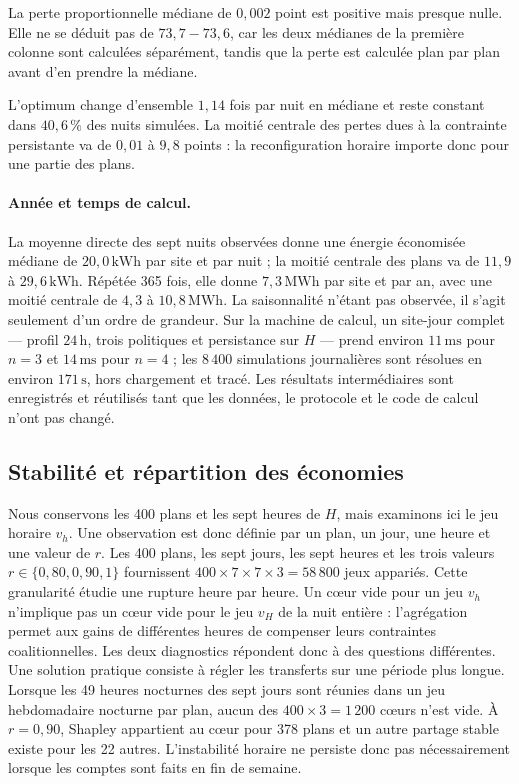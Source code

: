 La perte proportionnelle médiane de \(0{,}002\) point est positive mais
presque nulle. Elle ne se déduit pas de \(73{,}7-73{,}6\), car les deux
médianes de la première colonne sont calculées séparément, tandis que la
perte est calculée plan par plan avant d'en prendre la médiane.

L'optimum change d'ensemble \(1{,}14\) fois par nuit en médiane et reste
constant dans \(40{,}6\,\%\) des nuits simulées. La moitié centrale des pertes
dues à la contrainte persistante va de \(0{,}01\) à \(9{,}8\) points : la
reconfiguration horaire importe donc pour une partie des plans.

\paragraph{Année et temps de calcul.}
La moyenne directe des sept nuits observées donne une énergie économisée
médiane de \(20{,}0\,\mathrm{kWh}\) par site et par nuit ; la moitié centrale
des plans va de \(11{,}9\) à \(29{,}6\,\mathrm{kWh}\).
Répétée 365 fois, elle donne \(7{,}3\,\mathrm{MWh}\) par site et par an,
avec une moitié centrale de \(4{,}3\) à \(10{,}8\,\mathrm{MWh}\). La
saisonnalité n'étant pas observée,
il s'agit seulement d'un ordre de grandeur.
Sur la machine de calcul, un site-jour complet --- profil \(24\,\mathrm h\), trois
politiques et persistance sur \(H\) --- prend environ \(11\,\mathrm{ms}\) pour
\(n=3\) et \(14\,\mathrm{ms}\) pour \(n=4\) ; les \(8\,400\) simulations
journalières sont résolues en environ \(171\,\mathrm{s}\), hors chargement et tracé. Les
résultats intermédiaires sont enregistrés et réutilisés tant que les données,
le protocole et le code de calcul n'ont pas changé.

\subsection{Stabilité et répartition des économies}
\label{subsec:stabilite_grande_coalition}

Nous conservons les 400 plans et les sept heures de \(H\), mais examinons
ici le jeu horaire \(v_h\). Une observation est donc définie par un plan, un
jour, une heure et une valeur de \(r\). Les 400 plans, les sept jours, les
sept heures et les trois valeurs \(r\in\{0{,}80,0{,}90,1\}\) fournissent
\(400\times7\times7\times3=58\,800\) jeux appariés. Cette granularité étudie
une rupture heure par heure. Un cœur vide pour un jeu \(v_h\) n'implique pas
un cœur vide pour le jeu \(v_H\) de la nuit entière : l'agrégation permet aux
gains de différentes heures de compenser leurs contraintes coalitionnelles.
Les deux diagnostics répondent donc à des questions différentes.
Une solution pratique consiste à régler les transferts sur une période plus
longue. Lorsque les 49 heures nocturnes des sept jours sont réunies dans un
jeu hebdomadaire nocturne par plan, aucun des \(400\times3=1\,200\) cœurs
n'est vide. À
\(r=0{,}90\), Shapley appartient au cœur pour 378 plans et un autre partage
stable existe pour les 22 autres. L'instabilité horaire ne persiste donc pas
nécessairement lorsque les comptes sont faits en fin de semaine.

